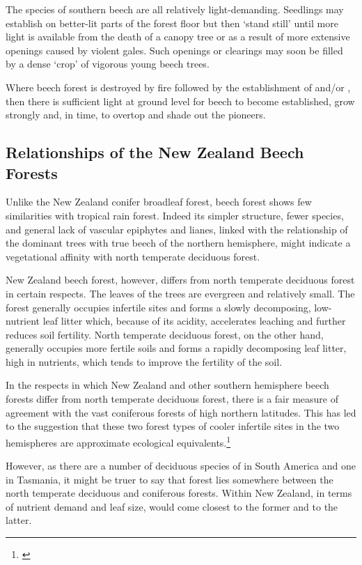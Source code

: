 The species of southern beech are all relatively light-demanding.
Seedlings may establish on better-lit parts of the forest floor but then `stand still' until more light is available from the death of a canopy tree or as a result of more extensive openings caused by violent gales.
Such openings or clearings may soon be filled by a dense `crop' of vigorous young beech trees.

Where beech forest is destroyed by fire followed by the establishment of  and/or , then there is sufficient light at ground level for beech to become established, grow strongly and, in time, to overtop and shade out the pioneers.

\subsection{Relationships of the New Zealand Beech Forests}

Unlike the New Zealand conifer broadleaf forest, beech forest shows few similarities with tropical rain forest.
Indeed its simpler structure, fewer species, and general lack of vascular epiphytes and lianes, linked with the relationship of the dominant trees with true beech of the northern hemisphere, might indicate a vegetational affinity with north temperate deciduous forest.

New Zealand beech forest, however, differs from north temperate deciduous forest in certain respects.
The leaves of the trees are evergreen and relatively small.
The forest generally occupies infertile sites and forms a slowly decomposing, low-nutrient leaf litter which, because of its acidity, accelerates leaching and further reduces soil fertility.
North temperate deciduous forest, on the other hand, generally occupies more fertile soils and forms a rapidly decomposing leaf litter, high in nutrients, which tends to improve the fertility of the soil.

In the respects in which New Zealand and other southern hemisphere beech forests differ from north temperate deciduous forest, there is a fair measure of agreement with the vast coniferous forests of high northern latitudes.
This has led to the suggestion that these two forest types of cooler infertile sites in the two hemispheres are approximate ecological equivalents.\footnote{\cite{dansereau1964six}}

However, as there are a number of deciduous species of  in South America and one in Tasmania, it might be truer to say that  forest lies somewhere between the north temperate deciduous and coniferous forests.
Within New Zealand, in terms of nutrient demand and leaf size,  would come closest to the former and  to the latter.
